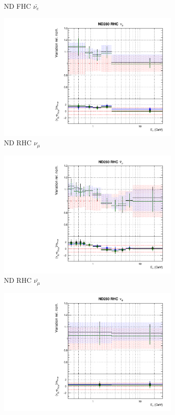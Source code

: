 \begin{figure}
\begin{subfigure}{0.45\textwidth}
  \caption{ND FHC $\bar{\nu_{e}}$}
\end{subfigure}
\begin{subfigure}{0.45\textwidth}
  \centering
  \includegraphics[width=0.75\linewidth]{figs/polydataflux_4}
  \caption{ND RHC $\nu_{\mu}$}
\end{subfigure}
\begin{subfigure}{0.45\textwidth}
  \centering
  \includegraphics[width=0.75\linewidth]{figs/polydataflux_5}
  \caption{ND RHC $\bar{\nu_{\mu}}$}
\end{subfigure}
\begin{subfigure}{0.45\textwidth}
  \centering
  \includegraphics[width=0.75\linewidth]{figs/polydataflux_6}

\end{subfigure}
\end{figure}
